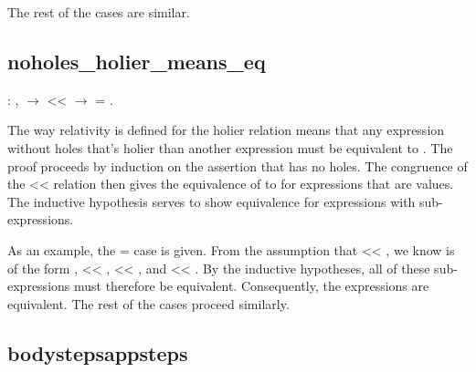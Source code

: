 \documentclass[12pt]{report}
\begin{document}
The rest of the cases are similar. 

\subsection{noholes\_holier\_means\_eq}

\begin{coqdoccode}
\coqdocemptyline
\coqdocindent{1.00em}
  : \coqdockw{\ensuremath{\forall}}  ,\coqdoceol
\coqdocindent{2.00em}
  \ensuremath{\rightarrow}\coqdoceol
\coqdocindent{2.00em}
 <<  \ensuremath{\rightarrow}\coqdoceol
\coqdocindent{2.00em}
 = .\coqdoceol
\coqdocemptyline
\end{coqdoccode}
The way relativity is defined for the holier relation means that
any expression without holes  that's holier than another
expression  must be equivalent to . The proof proceeds by
induction on the assertion that  has no holes. The congruence of
the << relation then gives the equivalence of  to  for
expressions that are values. The inductive hypothesis serves to show
equivalence for expressions with sub-expressions. 

 As an example, the  =     case is given. From the
assumption that     << , we know  is of the form
   ,  << ,  << , and  <<
. By the inductive hypotheses, all of these sub-expressions must
therefore be equivalent. Consequently, the  expressions are
equivalent. The rest of the cases proceed similarly. 

\subsection{bodystepsappsteps}
\end{document}
